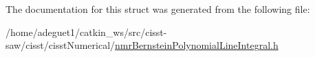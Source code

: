 The documentation for this struct was generated from the following file\-:\begin{DoxyCompactItemize}
\item 
/home/adeguet1/catkin\-\_\-ws/src/cisst-\/saw/cisst/cisst\-Numerical/\hyperlink{nmr_bernstein_polynomial_line_integral_8h}{nmr\-Bernstein\-Polynomial\-Line\-Integral.\-h}\end{DoxyCompactItemize}
